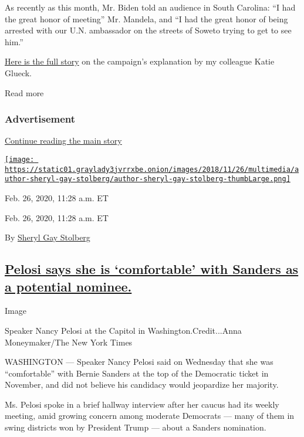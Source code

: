 As recently as this month, Mr. Biden told an audience in South Carolina:
``I had the great honor of meeting'' Mr. Mandela, and ``I had the great
honor of being arrested with our U.N. ambassador on the streets of
Soweto trying to get to see him.''

\href{https://www.nytimes3xbfgragh.onion/2020/02/26/us/politics/joe-biden-arrest-mandela.html}{Here
is the full story} on the campaign's explanation by my colleague Katie
Glueck.

Read more

\hypertarget{advertisement-5}{%
\subsubsection{Advertisement}\label{advertisement-5}}

\protect\hyperlink{after-dfp-ad-mid6}{Continue reading the main story}

\href{https://www.nytimes3xbfgragh.onion/by/sheryl-gay-stolberg}{\texttt{[image: https://static01.graylady3jvrrxbe.onion/images/2018/11/26/multimedia/author-sheryl-gay-stolberg/author-sheryl-gay-stolberg-thumbLarge.png]}}

Feb. 26, 2020, 11:28 a.m. ET

Feb. 26, 2020, 11:28 a.m. ET

By
\href{https://www.nytimes3xbfgragh.onion/by/sheryl-gay-stolberg}{Sheryl
Gay Stolberg}

\hypertarget{pelosi-says-she-is-comfortable-with-sanders-as-a-potential-nominee}{%
\subsection{\texorpdfstring{\protect\hyperlink{pelosi-says-she-is-comfortable-with-sanders-as-a-potential-nominee}{Pelosi
says she is `comfortable' with Sanders as a potential
nominee.}}{Pelosi says she is `comfortable' with Sanders as a potential nominee.}}\label{pelosi-says-she-is-comfortable-with-sanders-as-a-potential-nominee}}

Image

Speaker Nancy Pelosi at the Capitol in Washington.Credit...Anna
Moneymaker/The New York Times

WASHINGTON --- Speaker Nancy Pelosi said on Wednesday that she was
``comfortable'' with Bernie Sanders at the top of the Democratic ticket
in November, and did not believe his candidacy would jeopardize her
majority.

Ms. Pelosi spoke in a brief hallway interview after her caucus had its
weekly meeting, amid growing concern among moderate Democrats --- many
of them in swing districts won by President Trump --- about a Sanders
nomination.

